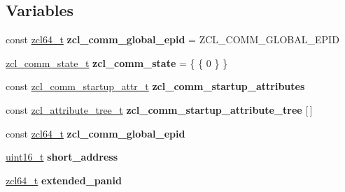 \subsection*{Variables}
\begin{DoxyCompactItemize}
\item 
\mbox{\label{group__zcl__commissioning_gaf8ec8c74f3638336b9a1a23e2b88a7ba}} 
const \hyperlink{group__zcl__64_ga2e906cb47fc172ae60da5178075dd3c7}{zcl64\+\_\+t} {\bfseries zcl\+\_\+comm\+\_\+global\+\_\+epid} = Z\+C\+L\+\_\+\+C\+O\+M\+M\+\_\+\+G\+L\+O\+B\+A\+L\+\_\+\+E\+P\+ID
\item 
\mbox{\label{group__zcl__commissioning_ga19d5f58d61bf7ad0d29386bc11aa48ae}} 
\hyperlink{structzcl__comm__state__t}{zcl\+\_\+comm\+\_\+state\+\_\+t} {\bfseries zcl\+\_\+comm\+\_\+state} = \{ \{ 0 \} \}
\item 
\mbox{\label{group__zcl__commissioning_gaa88e1b649cac11f8c31f63305ad3ca2d}} 
const \hyperlink{structzcl__comm__startup__attr__t}{zcl\+\_\+comm\+\_\+startup\+\_\+attr\+\_\+t} {\bfseries zcl\+\_\+comm\+\_\+startup\+\_\+attributes}
\item 
const \hyperlink{structzcl__attribute__tree__t}{zcl\+\_\+attribute\+\_\+tree\+\_\+t} {\bfseries zcl\+\_\+comm\+\_\+startup\+\_\+attribute\+\_\+tree} \mbox{[}$\,$\mbox{]}
\item 
\mbox{\label{group__zcl__commissioning_gaf8ec8c74f3638336b9a1a23e2b88a7ba}} 
const \hyperlink{group__zcl__64_ga2e906cb47fc172ae60da5178075dd3c7}{zcl64\+\_\+t} {\bfseries zcl\+\_\+comm\+\_\+global\+\_\+epid}
\item 
\mbox{\label{group__zcl__commissioning_ga46b7cb3df8b01ef7189662d2646332a6}} 
\hyperlink{group__hal__dos_ga5a8b2dc9e45a9ee81a94ef304fb62505}{uint16\+\_\+t} {\bfseries short\+\_\+address}
\item 
\mbox{\label{group__zcl__commissioning_ga69dbf2aa384fc28a2d4a1a032cf2857f}} 
\hyperlink{group__zcl__64_ga2e906cb47fc172ae60da5178075dd3c7}{zcl64\+\_\+t} {\bfseries extended\+\_\+panid}
\item 
\mbox{\label{group__zcl__commissioning_gafda9f3228971f93bd96dcf5aee89e35c}} 

\end{DoxyCompactItemize}
